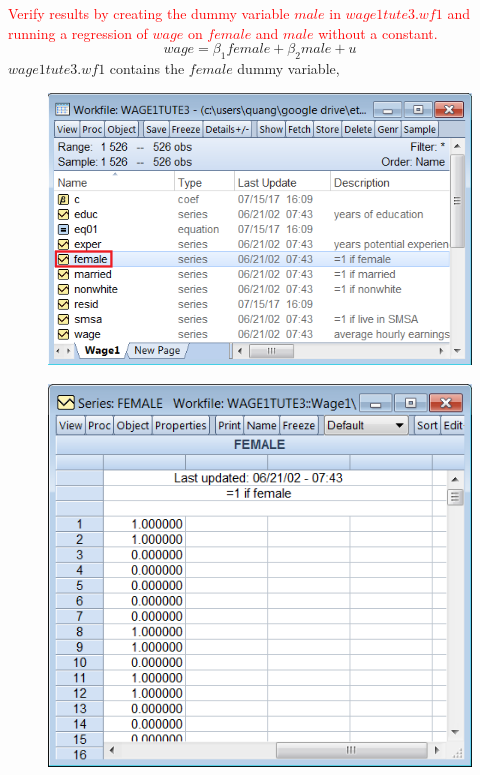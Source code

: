 \documentclass[12pt]{report}
\begin{document}
\noindent \textcolor{red}{Verify results by creating the dummy variable $male$ in $wage1tute3.wf1$ and running a regression of $wage$ on $female$ and $male$ without a constant.}
$$
wage = \beta_1female + \beta_2male + u
$$
\noindent $wage1tute3.wf1$ contains the $female$ dummy variable, 
\begin{figure}[H]
	\centering
	\includegraphics{q2_1}
\end{figure}
\vspace{-\baselineskip}
\begin{figure}[H]
	\centering
	\includegraphics{q2_2}
\end{figure}
\vspace{-\baselineskip}
\end{document}
